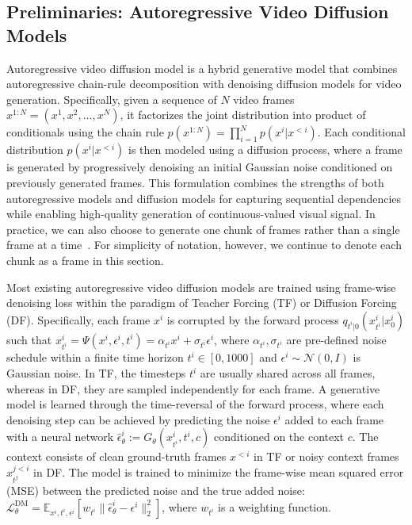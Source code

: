 \documentclass{article}
\begin{document}
\subsection{Preliminaries: Autoregressive Video Diffusion Models}
\label{sec:preliminaries}
Autoregressive video diffusion model is a hybrid generative model that combines autoregressive chain-rule decomposition with denoising diffusion models for video generation. %
Specifically, given a sequence of $N$ video frames \( x^{1:N} = (x^1, x^2, \dots, x^N) \), it factorizes the joint distribution into product of conditionals using the chain rule $p(x^{1:N}) = \prod_{i=1}^{N} p(x^i|x^{<i})$.
Each conditional distribution \( p(x^i|x^{<i}) \) is then modeled using a diffusion process, where a frame is generated by progressively denoising an initial Gaussian noise conditioned on previously generated frames.
This formulation combines the strengths of both autoregressive models and diffusion models for capturing sequential dependencies while enabling high-quality generation of continuous-valued visual signal.
In practice, we can also choose to generate one chunk of frames rather than a single frame at a time~\cite{yin2025causvid,magi1}. For simplicity of notation, however, we continue to denote each chunk as a frame in this section.

Most existing autoregressive video diffusion models are trained using frame-wise denoising loss within the paradigm of Teacher Forcing (TF) or Diffusion Forcing (DF).
Specifically, each frame \(x^i\) is corrupted by the forward process \( q_{t^i|0}(x_{t^i}^{i} | x_0^{i}) \) such that \(x_{t^i}^i  = \Psi(x^i, \epsilon^i, t^i) = \alpha_{t^i} x^i + \sigma_{t^i} \epsilon^i \), where \( \alpha_{t^i}, \sigma_{t^i} \) are pre-defined noise schedule within a finite time horizon \( t^i \in [0, 1000] \) and \( \epsilon^i \sim \mathcal{N}(0, I) \) is Gaussian noise. In TF, the timesteps $t^i$ are usually shared across all frames, whereas in DF, they are sampled independently for each frame.
A generative model is learned through the time-reversal of the forward process, where each denoising step can be achieved by predicting the noise $\epsilon^i$ added to each frame with a neural network \(\hat \epsilon_\theta^i := G_\theta(x_{t^i}^i, t^i, c) \) conditioned on the context $c$.
The context consists of clean ground-truth frames \( x^{<i} \) in TF or noisy context frames \( x^{j<i}_{t^j} \) in DF.
The model is trained to minimize the frame-wise mean squared error (MSE) between the predicted noise and the true added noise:
\( \mathcal{L}^{\text{DM}}_\theta = \mathbb{E}_{x^i, t^i, \epsilon^i} \left[ w_{t^i} \| \hat{\epsilon}^i_\theta - \epsilon^i \|_2^2 \right] \), where $w_{t^i}$ is a weighting function.
\end{document}
